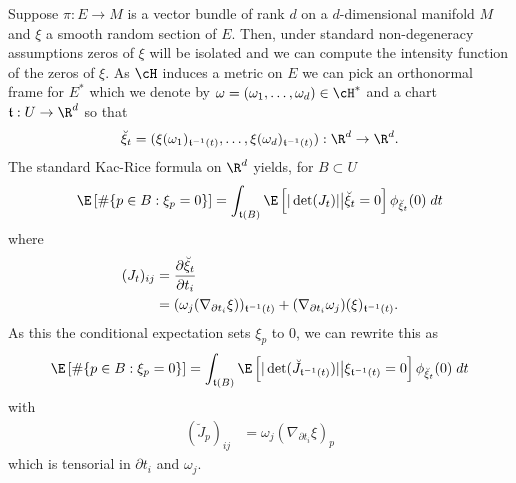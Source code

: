 \documentclass{article}
\begin{document}
Suppose $\pi:E \to M$ is a vector bundle of rank $d$ on a $d$-dimensional manifold $M$ and $\xi$
a smooth random section of $E$. Then, under standard non-degeneracy assumptions zeros of $\xi$ will be isolated
and we can compute the intensity function of the zeros of $\xi$. As $\cH$ induces a metric on $E$ we can pick
an orthonormal frame for $E^*$ which we denote by $\omega=(\omega_1, \dots, \omega_d) \in \cH^*$ and a chart
$\coordchart:U \to \R^d$ so that
$$
\breve{\xi}_t = (\xi(\omega_1)_{\coordchart^{-1}(t)}, \dots, \xi(\omega_d)_{\coordchart^{-1}(t)}): \R^d \to \R^d.
$$
The standard Kac-Rice formula on $\R^d$ yields, for $B \subset U$
$$
\begin{aligned}
\E \left[ \#\{p \in B: \xi_p=0\} \right] &= \int_{\coordchart(B)} \E\left[|\det(J_t)| \bigr | \breve{\xi}_t=0 \right] \phi_{\breve{\xi}_t}(0) \; dt \\
\end{aligned}
$$
where
$$
\begin{aligned}
  (J_t)_{ij} &= \frac{\partial \breve{\xi}_t}{\partial t_i} \\
  &= (\omega_j(\nabla_{\partial t_i}\xi))_{\mathfrak{t}^{-1}(t)} + (\nabla_{\partial t_i} \omega_j)(\xi)_{\mathfrak{t}^{-1}(t)}. \\
\end{aligned}
$$
As this the conditional expectation sets $\xi_p$ to 0, we can rewrite this as
$$
\begin{aligned}
\E \left[\# \{p \in B: \xi_p=0\} \right] &= \int_{\coordchart(B)} \E \left[|\det(\breve{J}_{\coordchart^{-1}(t)})| \bigr | \xi_{\coordchart^{-1}(t)}=0 \right] \phi_{\breve{\xi}_t}(0) \; dt \\
\end{aligned}
$$
with
$$
\begin{aligned}
  (\breve{J}_p)_{ij} &= \omega_j(\nabla_{\partial t_i}\xi)_{p}
\end{aligned}
$$
which is tensorial in $\partial t_i$ and $\omega_j$.
\end{document}
